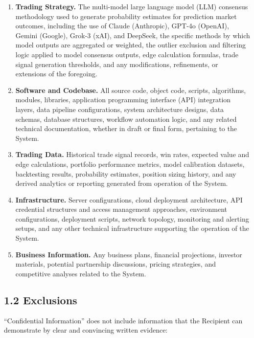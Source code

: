 \documentclass{article}
\begin{document}
\begin{enumerate}[label=(\alph*), leftmargin=2em]
\item \textbf{Trading Strategy.} The multi-model large language model (LLM) consensus methodology used to generate probability estimates for prediction market outcomes, including the use of Claude (Anthropic), GPT-4o (OpenAI), Gemini (Google), Grok-3 (xAI), and DeepSeek, the specific methods by which model outputs are aggregated or weighted, the outlier exclusion and filtering logic applied to model consensus outputs, edge calculation formulas, trade signal generation thresholds, and any modifications, refinements, or extensions of the foregoing.

\item \textbf{Software and Codebase.} All source code, object code, scripts, algorithms, modules, libraries, application programming interface (API) integration layers, data pipeline configurations, system architecture designs, data schemas, database structures, workflow automation logic, and any related technical documentation, whether in draft or final form, pertaining to the System.

\item \textbf{Trading Data.} Historical trade signal records, win rates, expected value and edge calculations, portfolio performance metrics, model calibration datasets, backtesting results, probability estimates, position sizing history, and any derived analytics or reporting generated from operation of the System.

\item \textbf{Infrastructure.} Server configurations, cloud deployment architecture, API credential structures and access management approaches, environment configurations, deployment scripts, network topology, monitoring and alerting setups, and any other technical infrastructure supporting the operation of the System.

\item \textbf{Business Information.} Any business plans, financial projections, investor materials, potential partnership discussions, pricing strategies, and competitive analyses related to the System.
\end{enumerate}

\subsection{1.2 Exclusions}

``Confidential Information'' does not include information that the Recipient can demonstrate by clear and convincing written evidence:
\end{document}
